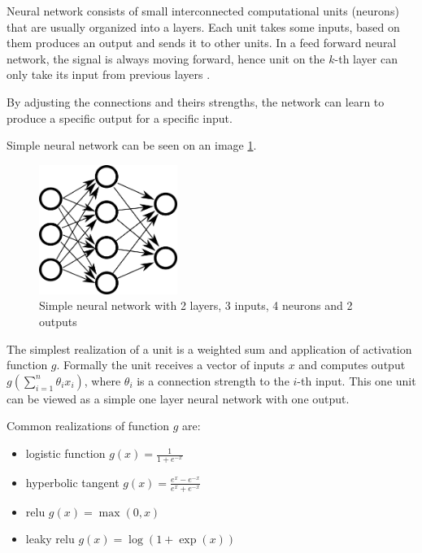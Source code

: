    Neural network consists of small interconnected computational units (neurons) that are usually organized into a layers.
    Each unit takes some inputs, based on them produces an output and sends it to other units. 
    In a feed forward neural network, the signal is always moving forward,
    hence unit on the $k$-th layer can only take its input from previous layers \cite{Goodfellow-et-al-2016}.
    
    By adjusting the connections and theirs strengths, the network can learn to produce a specific output for a specific input.
    
    Simple neural network can be seen on an image \ref{obr:siet}.
    
    \begin{figure}[h]
    \centerline{\includegraphics[width=0.4\textwidth]{images/neural_network}}
    \caption[Simple neural network with 2 layers, 3 inputs, 4 neurons and 2 outputs]{Simple neural network with 2 layers, 3 inputs, 4 neurons and 2 outputs\*} %
    \label{obr:siet}
    \end{figure}
    
    The simplest realization of a unit is a weighted sum and application of activation function $g$. 
    Formally the unit receives a vector of inputs $x$ and computes output $g(\sum_{i=1}^n \theta_i x_i)$, 
    where $\theta_i$ is a connection strength to the $i$-th input.
    This one unit can be viewed as a simple one layer neural network with one output.
    
    Common realizations of function $g$ are: 
    \begin{itemize}
        \item logistic function $g(x) = \frac{1}{1+e^{-x}}$
        \item hyperbolic tangent $g(x)=\frac{e^x-e^{-x}}{e^x+e^{-x}}$
        \item relu $g(x) = \max(0,x)$ 
        \item leaky relu $g(x)=\log(1+\exp(x))$
    \end{itemize}
    

